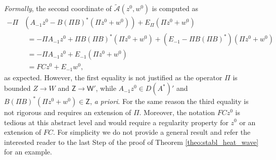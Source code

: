 \documentclass[10pt]{article}
\begin{document}
\textit{Formally}, the second coordinate of $\tilde{\mathcal{A}}(z^0,w^0)$ is computed as 
\begin{align*}
    -\Pi &\left( A_{-1} z^0 - B(\Pi B)^* (\Pi z^0 + w^0) \right) + E_\Pi (\Pi z^0 + w^0)  \\
    &~~= -\Pi A_{-1} z^0 + \Pi B(\Pi B)^* (\Pi z^0 + w^0)+ (E_{-1} - \Pi B(\Pi B)^*) (\Pi z^0 + w^0) \\
    &~~= -\Pi A_{-1} z^0 + E_{-1}  (\Pi z^0 + w^0) \\
    &~~= FC z^0 + E_{-1} w^0,
\end{align*}
as expected. However, the first equality is not justified as the operator $\Pi$ is bounded $Z \to W$ and $\mathsf{Z} \to \mathsf{W}'$, while $A_{-1} z^0 \in D(A^*)'$ and $B(\Pi B)^* (\Pi z^0 + w^0) \in \mathsf{Z}$, \textit{a priori}. For the same reason the third equality is not rigorous and requires an extension of $\Pi$. Moreover, the notation $FC z^0$ is tedious at this abstract level and would require a regularity property for $z^0$ or an extension of $FC$. For simplicity we do not provide a general result and refer the interested reader to the last Step of the proof of Theorem \ref{theo:stabl_heat_wave} for an example. 
\end{document}
